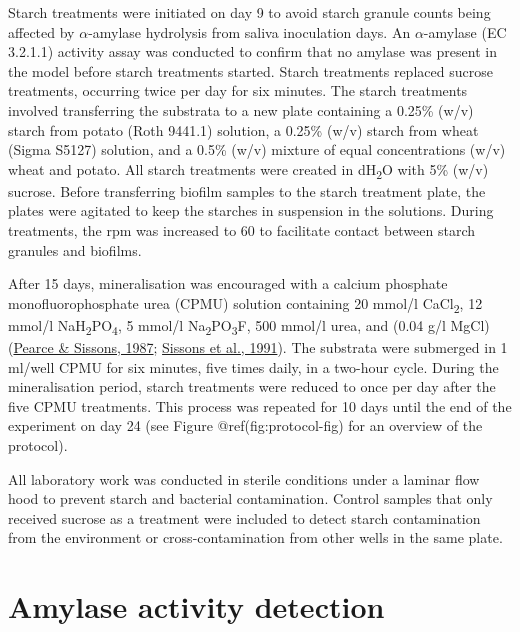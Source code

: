 \documentclass[
  letterpaper,
]{book}
\begin{document}
Starch treatments were initiated on day 9 to avoid starch granule counts
being affected by \(\alpha\)-amylase hydrolysis from saliva inoculation
days. An \(\alpha\)-amylase (EC 3.2.1.1) activity assay was conducted to
confirm that no amylase was present in the model before starch
treatments started. Starch treatments replaced sucrose treatments,
occurring twice per day for six minutes. The starch treatments involved
transferring the substrata to a new plate containing a 0.25\% (w/v)
starch from potato (Roth 9441.1) solution, a 0.25\% (w/v) starch from
wheat (Sigma S5127) solution, and a 0.5\% (w/v) mixture of equal
concentrations (w/v) wheat and potato. All starch treatments were
created in dH\textsubscript{2}O with 5\% (w/v) sucrose. Before
transferring biofilm samples to the starch treatment plate, the plates
were agitated to keep the starches in suspension in the solutions.
During treatments, the rpm was increased to 60 to facilitate contact
between starch granules and biofilms.

After 15 days, mineralisation was encouraged with a calcium phosphate
monofluorophosphate urea (CPMU) solution containing 20 mmol/l
CaCl\textsubscript{2}, 12 mmol/l
NaH\textsubscript{2}PO\textsubscript{4}, 5 mmol/l
Na\textsubscript{2}PO\textsubscript{3}F, 500 mmol/l urea, and (0.04 g/l
MgCl) (\protect\hyperlink{ref-pearceConcomitantDeposition1987}{Pearce \&
Sissons, 1987};
\protect\hyperlink{ref-sissonsMultistationPlaque1991}{Sissons et al.,
1991}). The substrata were submerged in 1 ml/well CPMU for six minutes,
five times daily, in a two-hour cycle. During the mineralisation period,
starch treatments were reduced to once per day after the five CPMU
treatments. This process was repeated for 10 days until the end of the
experiment on day 24 (see Figure @ref(fig:protocol-fig) for an overview
of the protocol).

All laboratory work was conducted in sterile conditions under a laminar
flow hood to prevent starch and bacterial contamination. Control samples
that only received sucrose as a treatment were included to detect starch
contamination from the environment or cross-contamination from other
wells in the same plate.

\hypertarget{amylase-activity-detection}{%
\section{Amylase activity detection}\label{amylase-activity-detection}}
\end{document}

